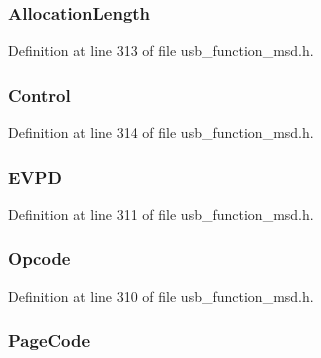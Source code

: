 \subsubsection[{Allocation\+Length}]{ Allocation\+Length}\label{struct_inquiry_c_b_a9cdd461d43ce26b92074bac3b76c6510}


Definition at line 313 of file usb\+\_\+function\+\_\+msd.\+h.

\hypertarget{struct_inquiry_c_b_a5dc24656c27deb12af74c98930f0bfc5}{}
\subsubsection[{Control}]{ Control}\label{struct_inquiry_c_b_a5dc24656c27deb12af74c98930f0bfc5}


Definition at line 314 of file usb\+\_\+function\+\_\+msd.\+h.

\hypertarget{struct_inquiry_c_b_a0da48c2e152b21f86bc8b04897fa1e8c}{}
\subsubsection[{E\+V\+P\+D}]{ E\+V\+P\+D}\label{struct_inquiry_c_b_a0da48c2e152b21f86bc8b04897fa1e8c}


Definition at line 311 of file usb\+\_\+function\+\_\+msd.\+h.

\hypertarget{struct_inquiry_c_b_a3ac7536b907732d60214ae553910eed9}{}
\subsubsection[{Opcode}]{ Opcode}\label{struct_inquiry_c_b_a3ac7536b907732d60214ae553910eed9}


Definition at line 310 of file usb\+\_\+function\+\_\+msd.\+h.

\hypertarget{struct_inquiry_c_b_a53ee9769775f645af63931eb0fef7922}{}
\subsubsection[{Page\+Code}]{ Page\+Code}\label{struct_inquiry_c_b_a53ee9769775f645af63931eb0fef7922}



